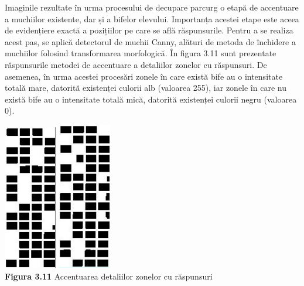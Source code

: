 \documentclass[a4paper,12pt]{report}
\newcommand\tab[1][1cm]{\hspace*{#1}}
\begin{document}
\tab Imaginile rezultate în urma procesului de decupare parcurg o etapă de accentuare a muchiilor existente, dar și a bifelor elevului. Importanța acestei etape este aceea de evidențiere exactă a pozițiilor pe care se află răspunsurile. Pentru a se realiza acest pas, se aplică detectorul de muchii Canny, alături de metoda de închidere a muchiilor folosind transformarea morfologică. În figura 3.11 sunt prezentate răspunsurile metodei de accentuare a detaliilor zonelor cu răspunsuri. De asemenea, în urma acestei procesări zonele în care există bife  au o intensitate totală mare, datorită existenței culorii alb (valoarea 255), iar zonele în care nu există bife au o intensitate totală mică, datorită existenței culorii negru (valoarea 0).  
\begin {center} 
	\begin {footnotesize} 
		\includegraphics[width = 23mm]{fig3_11_1} 
		\includegraphics[width = 23mm]{fig3_11_2} \\
		\textbf  {Figura 3.11} Accentuarea detaliilor zonelor cu răspunsuri
	\end {footnotesize} 
\end {center}
\end{document}
